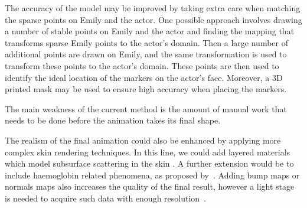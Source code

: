 The accuracy of the model may be improved by taking extra care when matching the sparse points on Emily and the actor. One possible approach involves drawing a number of stable points on Emily and the actor and finding the mapping that transforms sparse Emily points to the actor's domain. Then a large number of additional points are drawn on Emily, and the same transformation is used to transform these points to the actor's domain. These points are then used to identify the ideal location of the markers on the actor's face. Moreover, a 3D printed mask may be used to ensure high accuracy when placing the markers. %

The main weakness of the current method is the amount of manual work that needs to be done before the animation takes its final shape. 

The realism of the final animation could also be enhanced by applying more complex skin rendering techniques.
In this line, we could add layered materials which model subsurface scattering in the skin \cite{Weyrich2006}.
A further extension would be to include haemoglobin related phenomena, as proposed by~\cite{Donner2008, Jimenez2010}.
Adding bump maps or normals maps also increases the quality of the final result, however a light stage  is needed to acquire such data with enough resolution~\cite{Graham2013}.